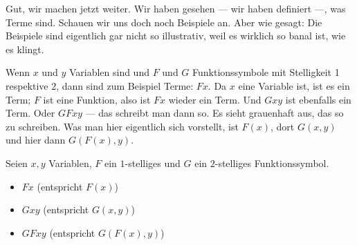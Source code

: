 \begin{math-stroke}
\end{math-stroke}

\begin{spoken-clean}[00:49:25 - 00:51:29]
Gut, wir machen jetzt weiter. Wir haben gesehen --- wir haben definiert ---, was Terme sind. Schauen wir uns doch noch Beispiele an. Aber wie gesagt: Die Beispiele sind eigentlich gar nicht so illustrativ, weil es wirklich so banal ist, wie es klingt. 

Wenn $x$ und $y$ Variablen sind und $F$ und $G$ Funktionssymbole mit Stelligkeit 1 respektive 2, dann sind zum Beispiel Terme: $Fx$. Da $x$ eine Variable ist, ist es ein Term; $F$ ist eine Funktion, also ist $Fx$ wieder ein Term. Und $Gxy$ ist ebenfalls ein Term. Oder $GFxy$ --- das schreibt man dann so. Es sieht grauenhaft aus, das so zu schreiben. Was man hier eigentlich sich vorstellt, ist $F(x)$, dort $G(x, y)$ und hier dann $G(F(x), y)$.
\end{spoken-clean}


\begin{math-stroke}
Seien $x, y$ Variablen, $F$ ein $1$-stelliges und $G$ ein $2$-stelliges Funktionssymbol.
\begin{examples}
\begin{itemize}
    \item $F x$ (entspricht $F(x)$)
    \item $G x y$ (entspricht $G(x, y)$)
    \item $G F x y$ (entspricht $G(F(x), y)$)
\end{itemize}
\end{examples}
\end{math-stroke}


